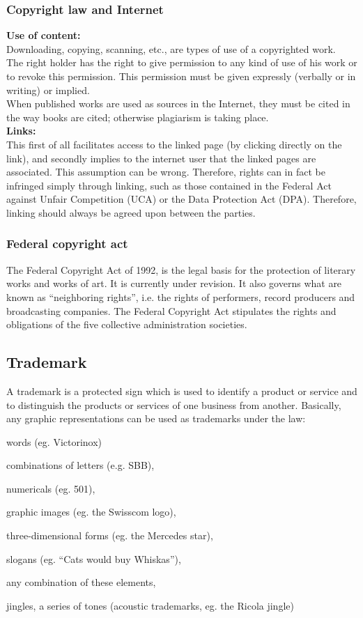 \subsubsection{Copyright law and Internet}
\textbf{Use of content:} \\
Downloading, copying, scanning, etc., are types of use of a copyrighted work. \\
The right holder has the right to give permission to any kind of use of his work or to revoke this permission. This permission must be given expressly (verbally or in writing) or implied. \\
When published works are used as sources in the Internet, they must be cited in the way books are cited; otherwise plagiarism is taking place. \\
\textbf{Links:} \\
This first of all facilitates access to the linked page (by clicking directly on the link), and secondly implies to the internet user that the linked pages are associated. This assumption can be wrong. Therefore, rights can in fact be infringed simply through linking, such as those contained in the Federal Act against Unfair Competition (UCA) or the Data
Protection Act (DPA). Therefore, linking should always be agreed upon between the parties.

\subsubsection{Federal copyright act}
The Federal Copyright Act of 1992, is the legal basis for the protection of literary works and works of art. It is currently under revision. It also governs what are known as “neighboring rights”, i.e. the rights of performers, record producers and broadcasting companies. The Federal Copyright Act stipulates the rights and obligations of the five
collective administration societies.

\subsection{Trademark}
A trademark is a protected sign which is used to identify a product or service and to distinguish the products or services of one business from another. Basically, any graphic representations can be used as trademarks under the law:
\begin{compactitem}
	\item words (eg. Victorinox)
	\item combinations of letters (e.g. SBB),
	\item numericals (eg. 501),
	\item graphic images (eg. the Swisscom logo),
	\item three-dimensional forms (eg. the Mercedes star),
	\item slogans (eg. “Cats would buy Whiskas”),
	\item any combination of these elements,
	\item jingles, a series of tones (acoustic trademarks, eg. the Ricola jingle)
\end{compactitem}

